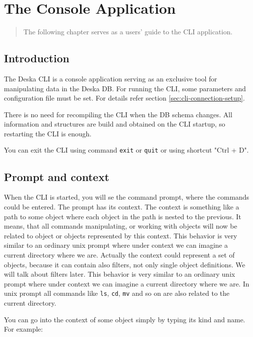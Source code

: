 \documentclass[deska]{subfiles}
\begin{document}
\chapter{The Console Application}
\label{sec:cli-usage}

\begin{abstract}
The following chapter serves as a users' guide to the CLI application.
\end{abstract}

\section{Introduction}

The Deska CLI is a console application serving as an exclusive tool for manipulating data in the Deska DB. For running the
CLI, some parameters and configuration file must be set. For details refer section \ref{sec:cli-connection-setup}.

There is no need for recompiling the CLI when the DB schema changes. All information and structures are build and obtained on the
CLI startup, so restarting the CLI is enough.

You can exit the CLI using command {\tt exit} or {\tt quit} or using shortcut "Ctrl + D".

\section{Prompt and context}

When the CLI is started, you will se the command prompt, where the commands could be entered. The prompt has its context.
The context is something like a path to some object where each object in the path is nested to the previous. 
It means, that all commands manipulating, or working with objects will now be related to object or objects represented by this context.
This behavior is very similar to an ordinary unix prompt where under context we can imagine a current directory where we are.
Actually the context could represent a set of objects, because it can contain also filters, not only single object definitions.
We will talk about filters later. This behavior is very similar to an ordinary unix prompt where under context
we can imagine a current directory where we are. In unix prompt all commands like {\tt ls}, {\tt cd}, {\tt mv} and so on
are also related to the current directory.

You can go into the context of some object simply by typing its kind and name. For example:
\end{document}
